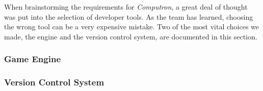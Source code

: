 When brainstorming the requirements for \textit{Computron}, a great deal of thought was put into the selection of developer tools. As the team has learned, choosing the wrong tool can be a very expensive mistake. Two of the most vital choices we made, the engine and the version control system, are documented in this section.

\subsubsection{Game Engine} \label{game_engine}


\subsubsection{Version Control System}


